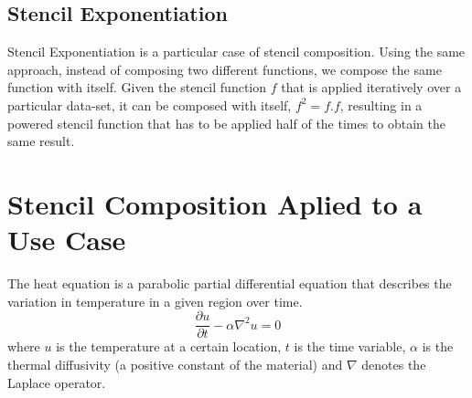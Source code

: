 \documentclass{acm_proc_article-sp}
\begin{document}






\subsection{Stencil Exponentiation}
Stencil Exponentiation is a particular case of stencil composition. Using the same approach, instead of composing two different functions, we compose the same function with itself. Given the stencil function $f$ that is applied iteratively over a particular data-set, it can be composed with itself, $f^2 = f . f$, resulting in a powered stencil function that has to be applied half of the times to obtain the same result.


\section{Stencil Composition Aplied to a Use Case}
\label{usecase}
The heat equation is a parabolic partial differential equation that describes the variation in temperature in a given region over time.
\begin{equation}
  \frac{\partial u}{\partial t}-\alpha\nabla^{2}u=0
  \label{eqn:heo}
\end{equation}
where $u$ is the temperature at a certain location, $t$ is the time variable, $\alpha$ is the thermal diffusivity (a positive constant of the material) and $\nabla$ denotes the Laplace operator\cite{cn:he}.
\end{document}
